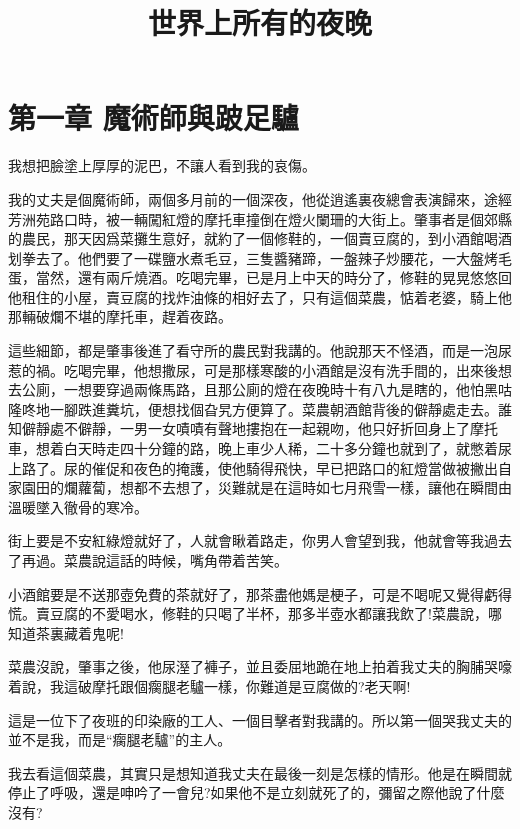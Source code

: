 \documentclass[a6paper]{article}
\begin{document}
	
\title{世界上所有的夜晚}
\date{}

\Large
\maketitle

\section{第一章  魔術師與跛足驢}

我想把臉塗上厚厚的泥巴，不讓人看到我的哀傷。

我的丈夫是個魔術師，兩個多月前的一個深夜，他從逍遙裏夜總會表演歸來，途經芳洲苑路口時，被一輛闖紅燈的摩托車撞倒在燈火闌珊的大街上。肇事者是個郊縣的農民，那天因爲菜攤生意好，就約了一個修鞋的，一個賣豆腐的，到小酒館喝酒划拳去了。他們要了一碟鹽水煮毛豆，三隻醬豬蹄，一盤辣子炒腰花，一大盤烤毛蛋，當然，還有兩斤燒酒。吃喝完畢，已是月上中天的時分了，修鞋的晃晃悠悠回他租住的小屋，賣豆腐的找炸油條的相好去了，只有這個菜農，惦着老婆，騎上他那輛破爛不堪的摩托車，趕着夜路。

這些細節，都是肇事後進了看守所的農民對我講的。他說那天不怪酒，而是一泡尿惹的禍。吃喝完畢，他想撒尿，可是那樣寒酸的小酒館是沒有洗手間的，出來後想去公廁，一想要穿過兩條馬路，且那公廁的燈在夜晚時十有八九是瞎的，他怕黑咕隆咚地一腳跌進糞坑，便想找個旮旯方便算了。菜農朝酒館背後的僻靜處走去。誰知僻靜處不僻靜，一男一女嘖嘖有聲地摟抱在一起親吻，他只好折回身上了摩托車，想着白天時走四十分鐘的路，晚上車少人稀，二十多分鐘也就到了，就憋着尿上路了。尿的催促和夜色的掩護，使他騎得飛快，早已把路口的紅燈當做被撇出自家園田的爛蘿蔔，想都不去想了，災難就是在這時如七月飛雪一樣，讓他在瞬間由溫暖墜入徹骨的寒冷。

街上要是不安紅綠燈就好了，人就會瞅着路走，你男人會望到我，他就會等我過去了再過。菜農說這話的時候，嘴角帶着苦笑。

小酒館要是不送那壺免費的茶就好了，那茶盡他媽是梗子，可是不喝呢又覺得虧得慌。賣豆腐的不愛喝水，修鞋的只喝了半杯，那多半壺水都讓我飲了!菜農說，哪知道茶裏藏着鬼呢!

菜農沒說，肇事之後，他尿溼了褲子，並且委屈地跪在地上拍着我丈夫的胸脯哭嚎着說，我這破摩托跟個瘸腿老驢一樣，你難道是豆腐做的?老天啊!

這是一位下了夜班的印染廠的工人、一個目擊者對我講的。所以第一個哭我丈夫的並不是我，而是“瘸腿老驢”的主人。

我去看這個菜農，其實只是想知道我丈夫在最後一刻是怎樣的情形。他是在瞬間就停止了呼吸，還是呻吟了一會兒?如果他不是立刻就死了的，彌留之際他說了什麼沒有?
\end{document}
